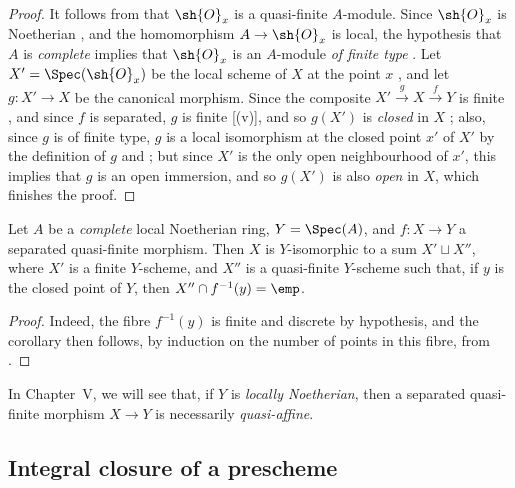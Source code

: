 \begin{proof}
It follows from  that $\sh{O}_x$ is a quasi-finite $A$-module.
Since $\sh{O}_x$ is Noetherian , and the homomorphism $A\to\sh{O}_x$ is local, the hypothesis that $A$ is \emph{complete} implies that $\sh{O}_x$ is an $A$-module \emph{of finite type} .
Let $X'=\Spec(\sh{O}_x)$ be the local scheme of $X$ at the point $x$ , and let $g:X'\to X$ be the canonical morphism.
Since the composite $X'\xrightarrow{g}X\xrightarrow{f}Y$ is finite , and since $f$ is separated, $g$ is finite [(v)], and so $g(X')$ is \emph{closed} in $X$ ;
also, since $g$ is of finite type, $g$ is a local isomorphism at the closed point $x'$ of $X'$ by the definition of $g$ and ;
but since $X'$ is the only open neighbourhood of $x'$, this implies that $g$ is an open immersion, and so $g(X')$ is also \emph{open} in $X$, which finishes the proof.
\end{proof}

\begin{corollary}[6.2.6]
\label{II.6.2.6}
Let $A$ be a \emph{complete} local Noetherian ring, $Y=\Spec(A)$, and $f:X\to Y$ a separated quasi-finite morphism.
Then $X$ is $Y$-isomorphic to a sum $X'\sqcup X''$, where $X'$ is a finite $Y$-scheme, and $X''$ is a quasi-finite $Y$-scheme such that, if $y$ is the closed point of $Y$, then $X''\cap f^{-1}(y)=\emp$.
\end{corollary}

\begin{proof}
Indeed, the fibre $f^{-1}(y)$ is finite and discrete by hypothesis, and the corollary then follows, by induction on the number of points in this fibre, from .
\end{proof}

\begin{remark}[6.2.7]
\label{II.6.2.7}
In Chapter~V, we will see that, if $Y$ is \emph{locally Noetherian}, then a separated quasi-finite morphism $X\to Y$ is necessarily \emph{quasi-affine}.
\end{remark}


\subsection{Integral closure of a prescheme}
\label{subsection:II.6.3}

